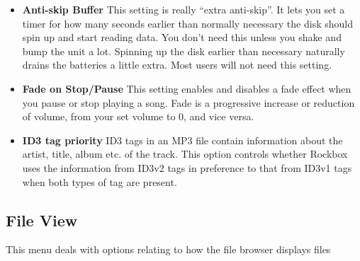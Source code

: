 \begin{itemize}
\item \textbf{Anti{}-skip Buffer}
  This setting is really ``extra anti{}-skip''. It lets you set a timer for how many seconds earlier than normally necessary the disk should spin up and start reading data. You don't need this unless you shake and bump the unit a lot. Spinning up the disk earlier than necessary naturally drains the batteries a little extra. Most users will not need this setting.

\item \textbf{Fade on Stop/Pause}
  This setting enables and disables a fade effect when you pause or stop playing a song. Fade is a progressive increase or reduction of volume, from your set volume to 0, and vice versa.

\item \textbf{ID3 tag priority}
  ID3 tags in an MP3 file contain information about the artist, title, album etc. of the track.  This option controls whether Rockbox uses the information from ID3v2 tags in preference to that from ID3v1 tags when both types of tag are present.
\end{itemize}

\subsection{File View}
This menu deals with options relating to how the file browser displays files

